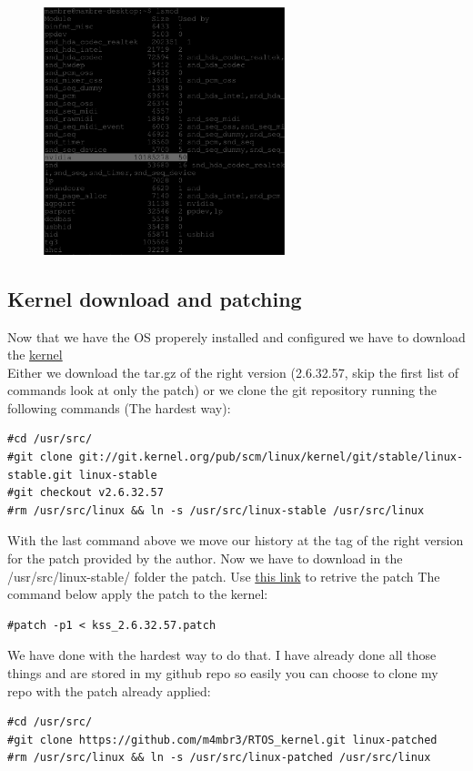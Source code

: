 \documentclass[a4paper,13pt]{article}
\begin{document}
\begin{multicols}{2}
\begin{itemize}
            \begin{figure}[H]
                \includegraphics[width=7cm]{eps/lsmod.eps}
            \end{figure}
    \end{itemize}

\subsection{Kernel download and patching \cite{kernel}}
    Now that we have the OS properely installed and configured we have to download the \href{www.kernel.org}{kernel}\\
    Either we download the tar.gz of  the right version (2.6.32.57, skip the first list of commands look at only the patch) or we clone the git repository running the following commands (The hardest way):\\
    \begin{lstlisting}
#cd /usr/src/
#git clone git://git.kernel.org/pub/scm/linux/kernel/git/stable/linux-stable.git linux-stable
#git checkout v2.6.32.57
#rm /usr/src/linux && ln -s /usr/src/linux-stable /usr/src/linux
    \end{lstlisting}
    With the last command above we move our history at the tag of the right version for the patch provided 
    by the author.
    Now we have to download in the /usr/src/linux-stable/ folder the patch. Use \href{https://mega.co.nz/#!R09hlSrY!TjYiR2m4xV6hadBFEuXAQ2r1-TBUB4LIkAU7-0sgn58}{this link} to retrive the patch 
    The command below apply the patch to the kernel:
\begin{lstlisting}
#patch -p1 < kss_2.6.32.57.patch
\end{lstlisting}
    We have done with the hardest way to do that. I have already done all those things and are stored in my github repo
    so easily you can choose to clone my repo with the patch already applied:
\begin{lstlisting}
#cd /usr/src/
#git clone https://github.com/m4mbr3/RTOS_kernel.git linux-patched
#rm /usr/src/linux && ln -s /usr/src/linux-patched /usr/src/linux
\end{lstlisting}


\end{multicols}
\end{document}
